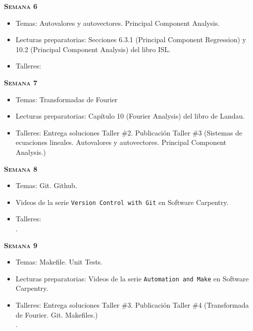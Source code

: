 \documentclass[letterpaper,10pt,onecolumn]{article}
\begin{document}
\noindent\textbf{\textsc{Semana 6}}\\[-0.5cm]
\begin{itemize}
\item Temas: Autovalores y autovectores. Principal Component
  Analysis. \\[-0.6cm]
\item Lecturas preparatorias: Secciones 6.3.1 (Principal Component
  Regression) y 10.2 (Principal Component Analysis) del libro ISL.\\[-0.6cm]
\item Talleres: \\[-0.6cm]
\end{itemize}

\noindent\textbf{\textsc{Semana 7}}\\[-0.5cm]
\begin{itemize}
\item Temas: Transformadas de Fourier\\[-0.6cm]
\item Lecturas preparatorias: Cap\'itulo 10 (Fourier Analysis) del
  libro de Landau.\\[-0.6cm] 
\item Talleres: 
Entrega soluciones Taller \#2. 
Publicaci\'on Taller \#3
(Sistemas de ecuaciones lineales. Autovalores y
autovectores. Principal Component Analysis.)
\\[-0.6cm]
\end{itemize}

\noindent\textbf{\textsc{Semana 8}}\\[-0.5cm]
\begin{itemize}
\item Temas: Git. Github. \\[-0.6cm]
\item Videos de la serie \texttt{Version Control with Git} en
  Software Carpentry.\\[-0.6cm]   
\item Talleres:\\[-0.6cm]. 
\end{itemize}

\noindent\textbf{\textsc{Semana 9}}\\[-0.5cm]
\begin{itemize}
\item Temas: Makefile. Unit Tests. \\[-0.6cm]
\item Lecturas preparatorias: Videos de la serie \texttt{Automation
  and Make} en Software Carpentry. \\[-0.6cm]
\item Talleres: 
Entrega soluciones Taller \#3. 
Publicaci\'on Taller \#4 
(Transformada de Fourier. Git. Makefiles.)
\\[-0.6cm]. 
\end{itemize}
\end{document}
